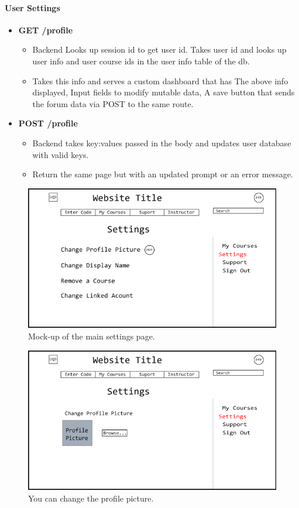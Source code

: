 \documentclass{article}
\begin{document}
\newpage

\paragraph{User Settings}
\vspace{\baselineskip}
\begin{itemize}
    \item \textbf{GET /profile}
        \begin{itemize}
        \item Backend Looks up session id to get user id. Takes user id and
            looks up user info and user course ids in the user info table of
                the db.
        \item Takes this info and serves a custom dashboard that has The above info displayed, Input fields to modify mutable data, A save button that sends the forum data via POST to the same route.
    \end{itemize}
\item \textbf{POST /profile}
    \begin{itemize}
        \item Backend takes key:values passed in the body and updates user database with valid keys.
        \item Return the same page but with an updated prompt or an error message.
    \end{itemize}
\end{itemize}
\begin{figure}[h!]
    \caption{Mock-up of the main settings page.}
    \includegraphics[width=\textwidth]{user_settings_page}
\end{figure}
\begin{figure}[h!]
    \caption{You can change the profile picture.}
    \includegraphics[width=\textwidth]{user_settings_page_pfp}
\end{figure}
\end{document}
